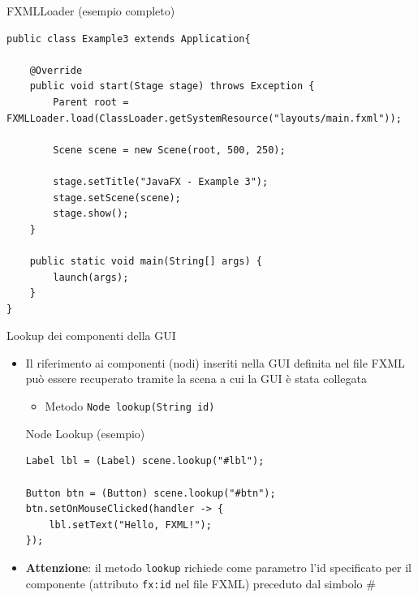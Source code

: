 \documentclass[xcolor=dvipsnames,presentation]{beamer}
\begin{document}
\begin{frame}[fragile]{FXMLLoader (esempio completo)}
\begin{lstlisting}
public class Example3 extends Application{

	@Override
	public void start(Stage stage) throws Exception {
	    Parent root = FXMLLoader.load(ClassLoader.getSystemResource("layouts/main.fxml"));

		Scene scene = new Scene(root, 500, 250);

		stage.setTitle("JavaFX - Example 3");
		stage.setScene(scene);
		stage.show();
	}

	public static void main(String[] args) {
		launch(args);
	}
}
\end{lstlisting}
\end{frame}

\begin{frame}[fragile]{Lookup dei componenti della GUI}
\begin{itemize}
\item Il riferimento ai componenti (nodi) inseriti nella GUI definita nel file FXML può essere recuperato tramite la scena a cui la GUI è stata collegata
\begin{itemize}
\item Metodo \texttt{Node lookup(String id)}
\end{itemize}

\begin{block}{Node Lookup (esempio)}
\begin{lstlisting}
Label lbl = (Label) scene.lookup("#lbl");

Button btn = (Button) scene.lookup("#btn");
btn.setOnMouseClicked(handler -> {
	lbl.setText("Hello, FXML!");
});
\end{lstlisting}
\end{block}
\item \textbf{Attenzione}: il metodo \texttt{lookup} richiede come parametro l'id specificato per il componente (attributo \texttt{fx:id} nel file FXML) preceduto dal simbolo \#
\end{itemize}
\end{frame}
\end{document}
